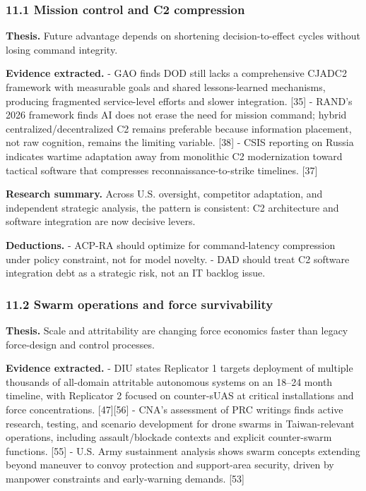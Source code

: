 \documentclass[11pt]{article}
\begin{document}
\hypertarget{mission-control-and-c2-compression}{%
\subsubsection{11.1 Mission control and C2
compression}\label{mission-control-and-c2-compression}}

\textbf{Thesis.} Future advantage depends on shortening
decision-to-effect cycles without losing command integrity.

\textbf{Evidence extracted.} - GAO finds DOD still lacks a comprehensive
CJADC2 framework with measurable goals and shared lessons-learned
mechanisms, producing fragmented service-level efforts and slower
integration. {[}35{]} - RAND's 2026 framework finds AI does not erase
the need for mission command; hybrid centralized/decentralized C2
remains preferable because information placement, not raw cognition,
remains the limiting variable. {[}38{]} - CSIS reporting on Russia
indicates wartime adaptation away from monolithic C2 modernization
toward tactical software that compresses reconnaissance-to-strike
timelines. {[}37{]}

\textbf{Research summary.} Across U.S. oversight, competitor adaptation,
and independent strategic analysis, the pattern is consistent: C2
architecture and software integration are now decisive levers.

\textbf{Deductions.} - ACP-RA should optimize for command-latency
compression under policy constraint, not for model novelty. - DAD should
treat C2 software integration debt as a strategic risk, not an IT
backlog issue.

\hypertarget{swarm-operations-and-force-survivability}{%
\subsubsection{11.2 Swarm operations and force
survivability}\label{swarm-operations-and-force-survivability}}

\textbf{Thesis.} Scale and attritability are changing force economics
faster than legacy force-design and control processes.

\textbf{Evidence extracted.} - DIU states Replicator 1 targets
deployment of multiple thousands of all-domain attritable autonomous
systems on an 18--24 month timeline, with Replicator 2 focused on
counter-sUAS at critical installations and force concentrations.
{[}47{]}{[}56{]} - CNA's assessment of PRC writings finds active
research, testing, and scenario development for drone swarms in
Taiwan-relevant operations, including assault/blockade contexts and
explicit counter-swarm functions. {[}55{]} - U.S. Army sustainment
analysis shows swarm concepts extending beyond maneuver to convoy
protection and support-area security, driven by manpower constraints and
early-warning demands. {[}53{]}
\end{document}
